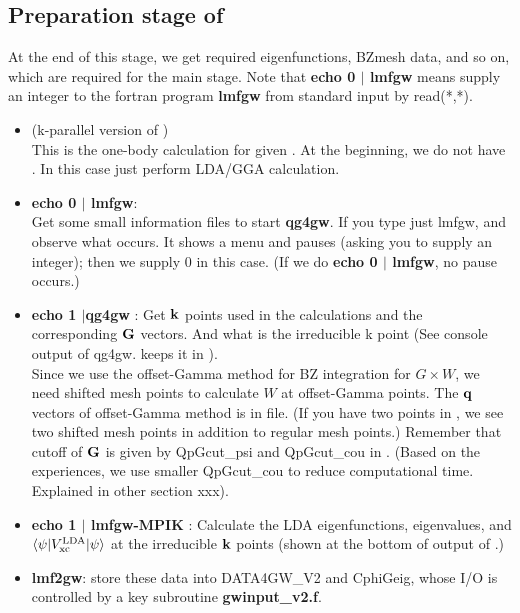 \subsection{\bf Preparation stage of }
At the end of this stage, 
we get required eigenfunctions, BZmesh data, and so on,
which are required for the main stage.
Note that 
{\bf echo 0 $|$ lmfgw} means supply an integer to the fortran program
{\bf lmfgw} from standard input by read(*,*).
\begin{itemize}
\item {} (k-parallel version of )\\
This is the one-body calculation for given .
At the beginning, we do not have .
In this case  just perform LDA/GGA calculation. 
\item{\bf echo 0 $|$ lmfgw}: \\
  Get some small information files to start {\bf qg4gw}.
  If you type just lmfgw, and observe what occurs.
  It shows a menu and pauses (asking you to supply an integer); then
  we supply 0 in this case. (If we do {\bf echo 0 $|$ lmfgw}, no pause occurs.)
\item{\bf echo 1 $|$qg4gw }: Get ${\bf k}$ points used
  in the \GW calculations and the corresponding ${\bf G}$ vectors.
  And what is the irreducible k point (See console output of qg4gw.
   keeps it in ).\\
  Since we use the offset-Gamma method for BZ integration for $G \times W$,
  we need shifted mesh points to calculate $W$ at offset-Gamma points.
  The ${\bf q}$ vectors of offset-Gamma method is in  file.
  (If you have two points in , we see two shifted mesh points in
   addition to regular mesh points.)
  Remember that cutoff of ${\bf G}$ is given by QpGcut\_psi and QpGcut\_cou
  in . (Based on the experiences, we use smaller QpGcut\_cou
  to reduce computational time. Explained in other section xxx).
\item{\bf echo 1 $|$ lmfgw-MPIK} : 
 Calculate the LDA eigenfunctions, eigenvalues, and
 $\langle \psi | V^{\rm LDA}_{\rm xc}| \psi \rangle$
 at the irreducible ${\bf k}$ points (shown at the bottom of output
      of .)
\item{\bf lmf2gw}: store these data into {\sf DATA4GW\_V2} and {\sf CphiGeig}, 
whose I/O is controlled by a key subroutine {\bf gwinput\_v2.f}.
\end{itemize}

